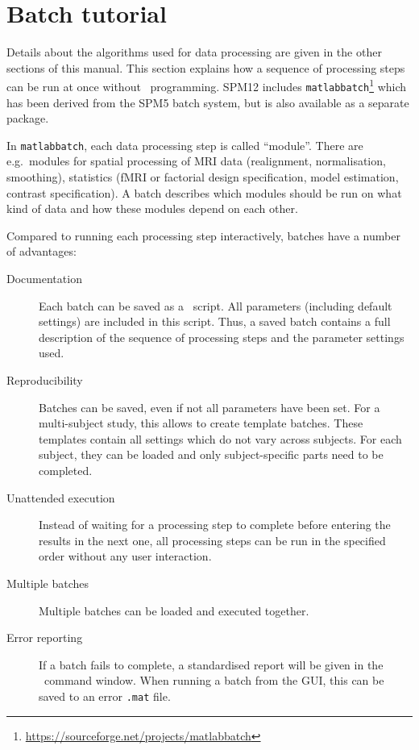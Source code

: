 \chapter{Batch tutorial}
\label{Chap:batch:tutorial}

Details about the algorithms used for data processing are given in the other
sections of this manual. This section explains how a sequence of processing
steps can be run at once without \matlab\ programming. SPM12 includes
\texttt{matlabbatch}\footnote{\url{https://sourceforge.net/projects/matlabbatch}}
which has been derived from the SPM5 batch system, but is also available as a
separate package.

In \texttt{matlabbatch}, each data processing step is called ``module''. There
are e.g.\ modules for spatial processing of MRI data (realignment,
normalisation, smoothing), statistics (fMRI or factorial design specification,
model estimation, contrast specification). A batch describes which modules
should be run on what kind of data and how these modules depend on each other.

Compared to running each processing step interactively, batches have a number
of advantages:
\begin{description}
\item[Documentation] Each batch can be saved as a \matlab\ script. All
  parameters (including default settings) are included in this script. Thus, a
  saved batch contains a full description of the sequence of processing steps
  and the parameter settings used.
\item[Reproducibility] Batches can be saved, even if not all parameters have
  been set. For a multi-subject study, this allows to create template batches.
  These templates contain all settings which do not vary across subjects. For
  each subject, they can be loaded and only subject-specific parts need to be
  completed.
\item[Unattended execution] Instead of waiting for a processing step to
  complete before entering the results in the next one, all processing steps
  can be run in the specified order without any user interaction.
\item[Multiple batches] Multiple batches can be loaded and executed together.
\item[Error reporting] If a batch fails to complete, a standardised report
  will be given in the \matlab\ command window.
  When running a batch from the GUI, this can be saved to an error \verb|.mat| file.
\end{description}

